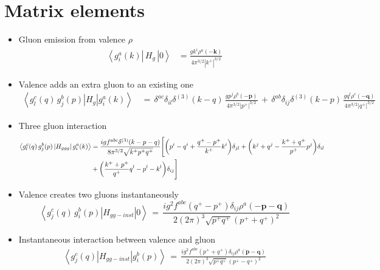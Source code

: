 \documentclass[aps,prd,amsmath,amssymb,nofootinbib]{revtex4-2}
\def\v#1{\mathbf{#1}}
\numberwithin{equation}{section}
\begin{document}
\newpage 
\section{Matrix elements}


\begin{itemize}
  
  \item   
    Gluon emission from valence $\rho$
    \begin{align}
      \label{m1}
      \left\langle g_{i}^{a}(k)\left|\, H_{g}\,\right|0\right\rangle &=
      \frac{g{k}^{i}\rho^{a}(-\v{k})}{4\pi^{3/2}|k^{+}|^{3/2}} 
    \end{align}
  
  \item Valence adds an extra gluon to an existing one 
    \begin{align}
      \left\langle g_{l}^{c}(q)\, g_{j}^{b}(p)\left|H_{g}\right|g_{i}^{a}(k)\right\rangle &\,=\,    %
      \delta^{ac}\delta_{il}\delta^{(3)}(k-q)\,\frac{g {p}^{j}\rho^{b}(-\mathbf{p})}{4\pi^{3/2}|p^{+}|^{3/2}}
      \,+\,\delta^{ab}\delta_{ij}\delta^{(3)}(k-p)\,\frac{g {q}^{l}\rho^{c}(-\mathbf{q})}{4\pi^{3/2}|q^{+}|^{3/2}}
      \label{m2}
    \end{align}

  \item Three gluon interaction 
    \begin{align}
      \left\langle g_{l}^{c}(q)\, g_{j}^{b}(p)\left|H_{ggg}\right|g_{i}^{a}(k)\right\rangle &  =
      \frac{igf^{abc}\delta^{(3)}(k-p-q)}{8\pi^{3/2}\sqrt{k^{+}p^{+}q^{+}}}
      \Bigg[\bigg({p}^{i}-{q}^{i}+\frac{q^{+}-p^{+}}{k^{+}}{k}^{i}\bigg)\delta_{jl}+\bigg({k}^{j}+{q}^{j}-\frac{k^{+}+q^{+}}{p^{+}}{p}^{j}\bigg)
      \delta_{il}\notag \\ & +\bigg(\frac{k^{+}+p^{+}}{q^{+}}{q}^{l}-{p}^{l}-{k}^{l}\bigg)\delta_{ij}\Bigg]
      \label{m3}
    \end{align}
    \item Valence creates two gluons instantaneously
    \begin{equation}
\left\langle g_{j}^{c}(q)\, g_{i}^{b}(p)\left|H_{gg-inst}\right|0\right\rangle \,=\,\frac{ig^{2}f^{abc}(q^{+}-p^{+})\delta_{ij}\rho^{a}(-\mathbf{p}-\mathbf{q})}{2(2\pi)^{3}\sqrt{p^{+}q^{+}}(p^{+}+q^{+})^{2}}
\label{m4}
 \end{equation}
  \item Instantaneous  interaction between valence and gluon  
    \begin{align}
      \left\langle g_{j}^{c}(q)\left|H_{gg-inst}\right|g_{i}^{b}(p)\right\rangle \,
      =\,  
      \frac{ig^{2}f^{abc}(p^{+}+q^{+})\delta_{ij}\rho^{a}(\mathbf{p}-\mathbf{q})}{2(2\pi)^{3}\sqrt{p^{+}q^{+}}(p^{+}-q^{+})^{2}}
      \label{m5}
    \end{align}
  \end{itemize}
\end{document}
